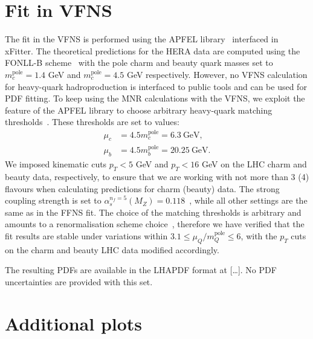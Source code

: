 \documentclass[12pt]{article}
\begin{document}




\clearpage
\appendix
\section{Fit in VFNS}
\label{sec:vfns}

The fit in the VFNS is performed using the APFEL library~\cite{Bertone:2013vaa} interfaced in xFitter.
The theoretical predictions for the HERA data are computed using the FONLL-B scheme~\cite{Forte:2010ta} with the pole charm and beauty quark masses set to $m_c^{\textrm{pole}} = 1.4$ GeV and $m_c^{\textrm{pole}} = 4.5$ GeV respectively.
However, no VFNS calculation for heavy-quark hadroproduction is interfaced to public tools and can be used for PDF fitting.
To keep using the MNR calculations with the VFNS, we exploit the feature of the APFEL library to choose arbitrary heavy-quark matching thresholds~\cite{Bertone:2017ehk}. These thresholds are set to values:
\begin{equation}
\begin{aligned}
\mu_c &= 4.5m_c^{\textrm{pole}} = 6.3~\textrm{GeV},\\
\mu_b &= 4.5m_b^{\textrm{pole}} =  20.25~\textrm{GeV}.
\end{aligned}
\end{equation}
We imposed kinematic cuts $p_T < 5$ GeV and $p_T < 16$ GeV on the LHC charm and beauty data, respectively, to ensure that we are working with not more than 3 (4) flavours when calculating predictions for charm (beauty) data. The strong coupling strength is set to $\alpha_s^{n_f = 5}(M_Z) = 0.118$~\cite{Tanabashi:2018oca}, while all other settings are the same as in the FFNS fit.
The choice of the matching thresholds is arbitrary and amounts to a renormalisation scheme choice~\cite{Bertone:2017ehk}, therefore we have verified that the fit results are stable under variations within $3.1 \le \mu_Q/m_Q^{\textrm{pole}} \le 6$, with the $p_T$ cuts on the charm and beauty LHC data modified accordingly.

The resulting PDFs are available in the LHAPDF format at [\dots]. No PDF uncertainties are provided with this set.

\section{Additional plots}
\label{sec:extraplots}
\end{document}
